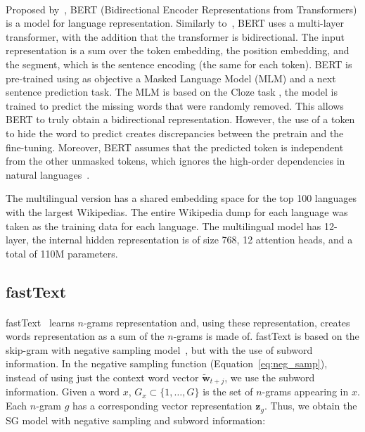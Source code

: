 \paragraph{}
Proposed by~\cite{devlin2018bert}, BERT (Bidirectional Encoder Representations from Transformers) is a model for language representation. Similarly to~\citep{radford2018improving}, BERT uses a multi-layer transformer, with the addition that the transformer is bidirectional. The input representation is a sum over the token embedding, the position embedding, and the segment, which is the sentence encoding (the same for each token). BERT is pre-trained using as objective a Masked Language Model (MLM) and a next sentence prediction task. The MLM is based on the Cloze task \citep{taylor1953cloze}, the model is trained to predict the missing words that were randomly removed. This allows BERT to truly obtain a bidirectional representation. However, the use of a token to hide the word to predict creates discrepancies between the pretrain and the fine-tuning. Moreover, BERT assumes that the predicted token is independent from the other unmasked tokens, which ignores the high-order dependencies in natural languages~\citep{yang2019xlnet}.


The multilingual version has a shared embedding space for the top 100 languages with the largest Wikipedias. The entire Wikipedia dump for each language was taken as the training data for each language. The multilingual model has 12-layer, the internal hidden representation is of size 768, 12 attention heads, and a total of 110M parameters.

\subsection{fastText}
\paragraph{}
fastText~\citep{bojanowski2016enriching} learns $n$-grams representation and, using these representation, creates words representation as a sum of the $n$-grams is made of. fastText is based on the skip-gram with negative sampling model~\citep{mikolov2013distributed}, but with the use of subword information. In the negative sampling function (Equation~\ref{eq:neg_samp}), instead of using just the context word vector $\mathbf{\tilde{w}}_{t+j}$, we use the subword information. Given a word $x$, $G_x \subset \{1, \dots, G\}$ is the set of $n$-grams appearing in $x$. Each $n$-gram $g$ has a corresponding vector representation $\mathbf{z}_{g}$. Thus, we obtain the SG model with negative sampling and subword information:  

